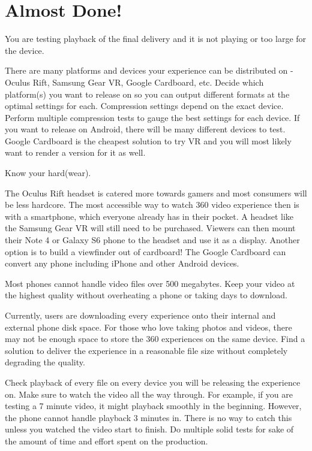 \chapter{Almost Done!}
\pagecolor{white}
\label{chap:57}
\begin{fullwidth}

\problem

{\large You are testing playback of the final delivery and it is not playing or too large for the device. \par}

There are many platforms and devices your experience can be distributed on - Oculus Rift, Samsung Gear VR, Google Cardboard, etc. Decide which platform(s) you want to release on so you can output different formats at the optimal settings for each. Compression settings depend on the exact device. Perform multiple compression tests to gauge the best settings for each device. If you want to release on Android, there will be many different devices to test. Google Cardboard is the cheapest solution to try VR and you will most likely want to render a version for it as well.

\solutions

{\large Know your hard(wear). \par}

The Oculus Rift headset is catered more towards gamers and most consumers will be less hardcore. The most accessible way to watch 360 video experience then is with a smartphone, which everyone already has in their pocket. A headset like the Samsung Gear VR will still need to be purchased. Viewers can then mount their Note 4 or Galaxy S6 phone to the headset and use it as a display. Another option is to build a viewfinder out of cardboard! The Google Cardboard can convert any phone including iPhone and other Android devices.
 
Most phones cannot handle video files over 500 megabytes. Keep your video at the highest quality without overheating a phone or taking days to download. 

Currently, users are downloading every experience onto their internal and external phone disk space. For those who love taking photos and videos, there may not be enough space to store the 360 experiences on the same device. Find a solution to deliver the experience in a reasonable file size without completely degrading the quality.

Check playback of every file on every device you will be releasing the experience on. Make sure to watch the video all the way through. For example, if you are testing a 7 minute video, it might playback smoothly in the beginning. However, the phone cannot handle playback 3 minutes in. There is no way to catch this unless you watched the video start to finish. Do multiple solid tests for sake of the amount of time and effort spent on the production.


\end{fullwidth}
